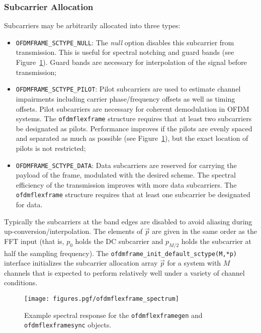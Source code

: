 \subsubsection{Subcarrier Allocation}
\label{module:framing:ofdmflexframe:subcarrier_allocation}

Subcarriers may be arbitrarily allocated into three types:
\begin{itemize}
\item {\tt OFDMFRAME\_SCTYPE\_NULL}:
      The {\em null} option disables this subcarrier from transmission.
      This is useful for
      spectral notching and
      guard bands
      (see Figure~\ref{fig:module:framing:ofdmflexframe_spectrum}).
      Guard bands are necessary for interpolation of the signal before
      transmission;
\item {\tt OFDMFRAME\_SCTYPE\_PILOT}:
      Pilot subcarriers are used to estimate channel impairments
      including carrier phase/frequency offsets as well as timing
      offsets.
      Pilot subcarriers are necessary for coherent demodulation in OFDM
      systems.
      The {\tt ofdmflexframe} structure requires that at least two
      subcarriers be designated as pilots.
      Performance improves if the pilots are evenly spaced and separated
      as much as possible
      (see Figure~\ref{fig:module:framing:ofdmflexframe_spectrum}),
      but the exact location of pilots is not restricted;
\item {\tt OFDMFRAME\_SCTYPE\_DATA}:
      Data subcarriers are reserved for carrying the payload of the
      frame, modulated with the desired scheme.
      The spectral efficiency of the transmission improves with more
      data subcarriers.
      The {\tt ofdmflexframe} structure requires that at least one
      subcarrier be designated for data.
\end{itemize}
%
Typically the subcarriers at the band edges are disabled to avoid
aliasing during up-conversion/interpolation.
%
The elements of $\vec{p}$ are given in the same order as the FFT input
(that is, $p_0$ holds the DC subcarrier and $p_{M/2}$ holds the
subcarrier at half the sampling frequency).
%
The {\tt ofdmframe\_init\_default\_sctype(M,*p)} interface
initializes the subcarrier allocation array $\vec{p}$
for a system with $M$ channels that is expected to perform relatively
well under a variety of channel conditions.
% 
%
\begin{figure}
\centering
  \texttt{[image: figures.pgf/ofdmflexframe\_spectrum]}
\caption{
    Example spectral response for the
    {\tt ofdmflexframegen} and
    {\tt ofdmflexframesync} objects.}
\label{fig:module:framing:ofdmflexframe_spectrum}
\end{figure}
